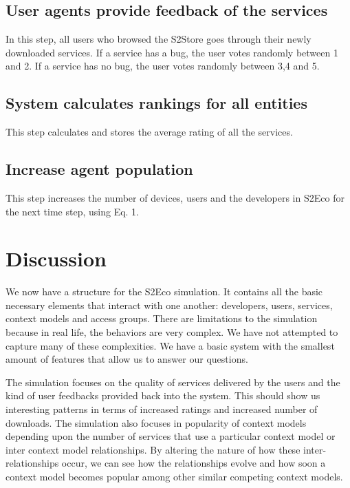 \subsection{User agents provide feedback of the services}

In this step, all users who browsed the S2Store goes through their newly downloaded services. If a service has a bug, the user votes randomly between 1 and 2. If a service has no bug, the user votes randomly between 3,4 and 5.

\subsection{System calculates rankings for all entities}

This step calculates and stores the average rating of all the services.

\subsection{Increase agent population}

This step increases the number of devices, users and the developers in S2Eco for the next time step, using Eq. 1.

\section{Discussion}

We now have a structure for the S2Eco simulation. It contains all the basic necessary elements that interact with one another: developers, users, services, context models and access groups. There are limitations to the simulation because in real life, the behaviors are very complex. We have not attempted to capture many of these complexities. We have a basic system with the smallest amount of features that allow us to answer our questions.

The simulation focuses on the quality of services delivered by the users and the kind of user feedbacks provided back into the system. This should show us interesting patterns in terms of increased ratings and increased number of downloads. The simulation also focuses in popularity of context models depending upon the number of services that use a particular context model or inter context model relationships. By altering the nature of how these inter-relationships occur, we can see how the relationships evolve and how soon a context model becomes popular among other similar competing context models.
